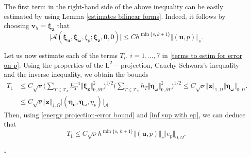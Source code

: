 \documentclass[reqno,a4paper]{article}
\numberwithin{equation}{section}
\newcommand\bu{\boldsymbol{u}}
\newcommand\bv{\boldsymbol{v}}
\newcommand\bz{\boldsymbol{z}}
\newcommand\cT{\mathcal{T}}
\renewcommand\O{\Omega}
\renewcommand\L{\mathrm{L}}
\newcommand\bomega{\boldsymbol{\omega}}
\newcommand\bxi{\boldsymbol{\xi}}
\newcommand\betta{\boldsymbol{\eta}}
\newenvironment{proof}{\noindent{\it Proof.}}{\hfill$\square$}
\begin{document}
\begin{proof}
  The first term in the right-hand side of the above inequality
  can be easily estimated by using Lemma \ref{estimates bilinear forms}.
  Indeed, it follows by choosing $\bv_h=\bxi_{\bz}$ that 
 \begin{equation*}
  \vert\mathcal{A}(\bxi_{\bu}, \bxi_{\bomega},\xi_{p}; \bxi_{\bz},\textbf{0},0)\vert\leq C h^{\min\{s,k+1\}} \Vert(\bu,p)\Vert_{s}.
 \end{equation*}
 
Let us now estimate each of the terms $T_i$, $i=1,\ldots,7$ in \eqref{terms to estim for error on p}.
Using the properties of the $\L^2-$projection, Cauchy-Schwarz's inequality and the inverse inequality, we obtain 
the bounds 
\begin{align*}
 T_1&\leq C\sqrt{\nu} \Big(\sum_{T\in \cT_h}h_{T}^{-1}\Vert\bxi_{\bz}\Vert^{2}_{0,\partial T}\Big)^{1/2} \Big(\sum_{T\in \cT_h}h_{T}\Vert\betta_{\bomega}\Vert^{2}_{0,\partial T}\Big)^{1/2}\leq C \sqrt{\nu}\Vert\bz\Vert_{1,\O}\Vert\betta_{\bomega}\Vert_{0,\O}.\\
 &\leq  C \sqrt{\nu}\Vert\bz\Vert_{1,\O}\vert(\betta_{\bu} ,\betta_{\bomega},\eta_p)\vert_{\mathcal{A}}
 \end{align*}
Then, using \eqref{energy projection-error bound} and \eqref{inf sup with ep}, we can deduce that 
\begin{equation*}
T_1\leq C \sqrt{\nu} h^{\min\{s,\,k+1\}}\Vert(\bu,p)\Vert_{s}\Vert e_p\Vert_{0,\O}.
\end{equation*}


\end{proof}
\end{document}
